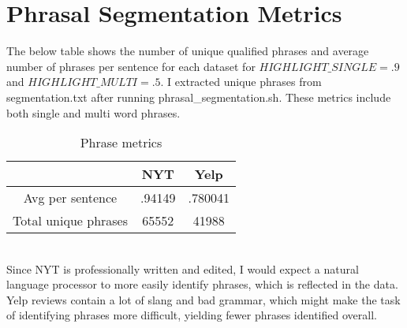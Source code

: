 \documentclass{article}
\begin{document}
\section*{Phrasal Segmentation Metrics}
The below table shows the number of unique qualified phrases and average number of phrases per sentence for each dataset for $HIGHLIGHT\_SINGLE=.9$ and $HIGHLIGHT\_MULTI=.5$.  I extracted unique phrases from segmentation.txt after running phrasal\_segmentation.sh.  These metrics include both single and multi word phrases.
\begin{table}[ht]
    \centering
    \begin{tabular}{|c|c|c|}
        \hline
        & NYT & Yelp \\
        \hline
        Avg per sentence & .94149 & .780041 \\
        \hline
        Total unique phrases & 65552 & 41988\\
        \hline
    \end{tabular}
    \caption{Phrase metrics}
    \label{tab:my_label}
\end{table}\\
Since NYT is professionally written and edited, I would expect a natural language processor to more easily identify phrases, which is reflected in the data.  Yelp reviews contain a lot of slang and bad grammar, which might make the task of identifying phrases more difficult, yielding fewer phrases identified overall.\\\\
\end{document}
